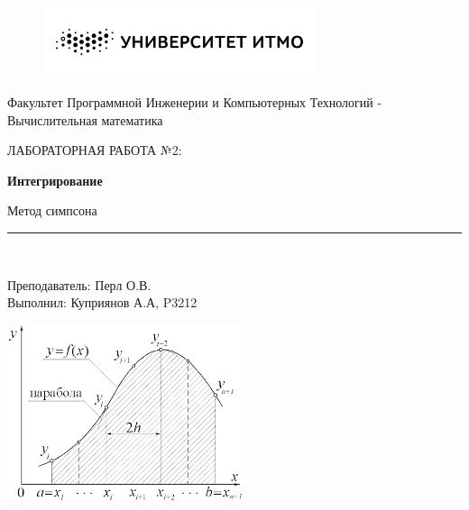 \documentclass[11pt, english]{article}
\makeatletter
\newcounter{unomenos}
\gdef\@date{\arabic{unomenos}}
\makeatother
\begin{document}
\begin{titlepage}

\begin{center}
\vspace*{-1in}
\begin{figure}[htb]
\begin{center}
\includegraphics[width=8cm]{bw_w_rus.png}
\end{center}
\end{figure}

Факультет Программной Инженерии и Компьютерных Технологий - \@date\\
\vspace*{0.15in}
Вычислительная математика \\
\vspace*{0.4in}
\begin{large}
ЛАБОРАТОРНАЯ РАБОТА №2:\\
\end{large}
\vspace*{0.2in}
\begin{Large}
\textbf{Интегрирование} \\
\end{Large}
\vspace*{0.3in}
\begin{large}
Метод симпсона \\
\end{large}
\vspace*{0.3in}
\rule{80mm}{0.1mm}\\
\vspace*{0.1in}
\begin{large}
Преподаватель: Перл О.В. \\
Выполнил: Куприянов А.А, P3212 \\
\end{large}
\vspace*{1.5in}
\includegraphics[width=7cm]{unnamed.png}
\end{center}
\end{titlepage}
\end{document}

